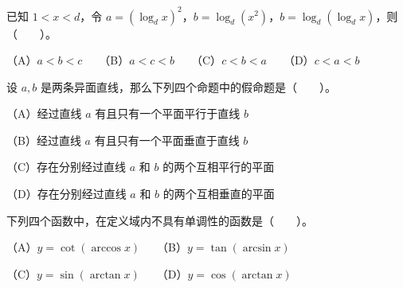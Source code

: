 \begin{question}
已知 $1<x<d$，令 $a=(\log_d x)^2$，$b=\log_d(x^2)$，$b=\log_d(\log_d x)$，则\mbox{（　　）}。

（A）$a<b<c$　　（B）$a<c<b$　　（C）$c<b<a$　　（D）$c<a<b$

\end{question}
\begin{question}
设 $a,b$ 是两条异面直线，那么下列四个命题中的假命题是\mbox{（　　）}。

（A）经过直线 $a$ 有且只有一个平面平行于直线 $b$

（B）经过直线 $a$ 有且只有一个平面垂直于直线 $b$

（C）存在分别经过直线 $a$ 和 $b$ 的两个互相平行的平面

（D）存在分别经过直线 $a$ 和 $b$ 的两个互相垂直的平面

\end{question}
\begin{question}
下列四个函数中，在定义域内不具有单调性的函数是\mbox{（　　）}。

（A）$y=\cot(\arccos x)$　　（B）$y=\tan(\arcsin x)$

（C）$y=\sin(\arctan x)$　　（D）$y=\cos(\arctan x)$

\end{question}


